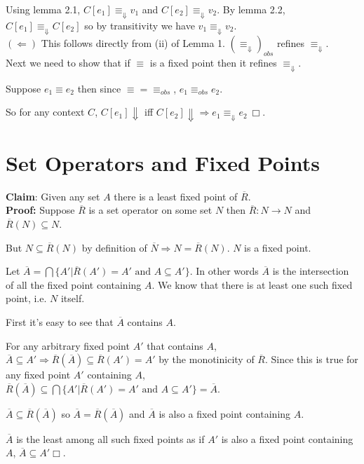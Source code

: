 \documentclass[10pt]{article}
\newcommand{\problem}[1]{\section{\sf #1}}
\begin{document}
Using lemma 2.1, $C[e_1] \equiv_{\Downarrow} v_1$ and $C[e_2] \equiv_{\Downarrow} v_2$. By lemma 2.2, $C[e_1] \equiv_{\Downarrow} C[e_2]$ so by transitivity we have $v_1 \equiv_{\Downarrow} v_2.$\\

$(\Leftarrow)$ This follows directly from (ii) of Lemma 1. $(\equiv_{\Downarrow})_{obs}$ refines $\equiv_{\Downarrow}$.\\

Next we need to show that if $\equiv$ is a fixed point then it refines $\equiv_{\Downarrow}$.

Suppose $e_1 \equiv e_2$ then since $\equiv = \equiv_{obs}$, $e_1 \equiv_{obs} e_2$. 

So for any context $C$, $C[e_1] \Downarrow$ iff $C[e_2] \Downarrow \Rightarrow e_1 \equiv_{\Downarrow} e_2~ \Box$. 


\problem{Set Operators and Fixed Points}

\textbf{Claim}: Given any set $A$ there is a least fixed point of $\overline R$.\\

\textbf{Proof:} Suppose $\overline R$ is a set operator on some set $N$ then $\overline R : N \rightarrow N$ and $\overline R (N) \subseteq N$.

But $N \subseteq \overline R (N)$ by definition of $\overline{N} \Rightarrow N = \overline{R} (N)$. $N$ is a fixed point.

Let $\overline{A} = \bigcap \{A' | \overline{R} (A') = A' \text{ and } A \subseteq A'\}$. In other words $\overline{A}$ is the intersection of all the fixed point containing $A$. We know that there is at least one such fixed point, i.e. $N$ itself.

First it's easy to see that $\overline{A}$ contains $A$.

For any arbitrary fixed point $A'$ that contains $A$, $\overline{A} \subseteq A'\Rightarrow \overline{R} (\overline{A}) \subseteq \overline R (A') = A'$ by the monotinicity of $\overline R$. Since this is true for any fixed point $A'$ containing $A$,  $\overline{R} (\overline{A}) \subseteq \bigcap \{A' | \overline{R} (A') = A' \text{ and } A \subseteq A'\} = \overline{A}$.

$\overline{A} \subseteq \overline{R} (\overline{A})$ so $\overline{A} = \overline{R} (\overline{A})$ and $\overline{A}$ is also a fixed point containing $A$.

$\overline{A}$ is the least among all such fixed points as if $A'$ is also a fixed point containing $A$, $\overline{A} \subseteq A' \Box$.\\
\end{document}
